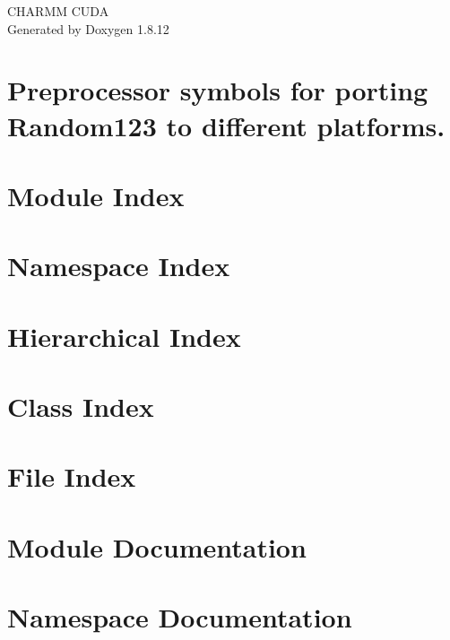 \documentclass[twoside]{book}
\newcommand{\+}{\discretionary{\mbox{\scriptsize$\hookleftarrow$}}{}{}}
\newcommand{\clearemptydoublepage}{%
  \newpage{\pagestyle{empty}\cleardoublepage}%
}
\begin{document}
\hypersetup{pageanchor=false,
             bookmarksnumbered=true,
             pdfencoding=unicode
            }
\begin{titlepage}
\vspace*{7cm}
\begin{center}%
{\Large C\+H\+A\+R\+MM C\+U\+DA }\\
\vspace*{1cm}
{\large Generated by Doxygen 1.8.12}\\
\end{center}
\end{titlepage}
\clearemptydoublepage
{}
\tableofcontents
\clearemptydoublepage
{}
\hypersetup{pageanchor=true}

\chapter{Preprocessor symbols for porting Random123 to different platforms.}
\label{porting}
\hypertarget{porting}{}

\chapter{Module Index}

\chapter{Namespace Index}

\chapter{Hierarchical Index}

\chapter{Class Index}

\chapter{File Index}

\chapter{Module Documentation}


\chapter{Namespace Documentation}

\end{document}

